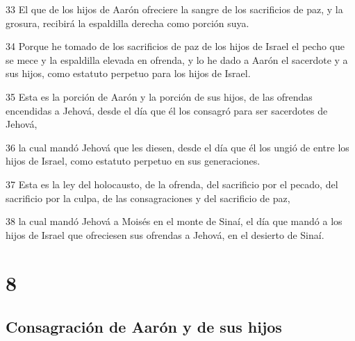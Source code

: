 \par 33 El que de los hijos de Aarón ofreciere la sangre de los sacrificios de paz, y la grosura, recibirá la espaldilla derecha como porción suya.
\par 34 Porque he tomado de los sacrificios de paz de los hijos de Israel el pecho que se mece y la espaldilla elevada en ofrenda, y lo he dado a Aarón el sacerdote y a sus hijos, como estatuto perpetuo para los hijos de Israel.
\par 35 Esta es la porción de Aarón y la porción de sus hijos, de las ofrendas encendidas a Jehová, desde el día que él los consagró para ser sacerdotes de Jehová,
\par 36 la cual mandó Jehová que les diesen, desde el día que él los ungió de entre los hijos de Israel, como estatuto perpetuo en sus generaciones.
\par 37 Esta es la ley del holocausto, de la ofrenda, del sacrificio por el pecado, del sacrificio por la culpa, de las consagraciones y del sacrificio de paz,
\par 38 la cual mandó Jehová a Moisés en el monte de Sinaí, el día que mandó a los hijos de Israel que ofreciesen sus ofrendas a Jehová, en el desierto de Sinaí. 

\chapter{8}

\section*{Consagración de Aarón y de sus hijos}

